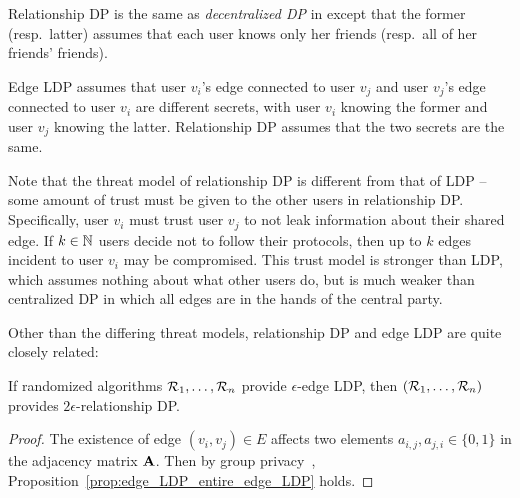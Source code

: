 Relationship DP is the same as \textit{decentralized DP} in \cite{Sun_CCS19} except that the former (resp.~latter) assumes that each user knows only her friends (resp.~all of her friends' friends).

Edge LDP assumes that 
user $v_i$'s edge connected to user $v_j$ 
and 
user $v_j$'s edge connected to user $v_i$ 
are different secrets, with user $v_i$ knowing the former and user $v_j$ knowing the latter. 
Relationship DP assumes that the two secrets are the same.

Note that 
the threat model of relationship DP is 
different from 
that of 
LDP -- 
some amount of trust must be given to the other users 
in relationship DP. 
Specifically, user $v_i$ must trust user $v_j$ to not leak information
about their shared edge. If $k \in \mathbb{N}$ users decide not to follow their protocols, 
then up to $k$ edges incident to user $v_i$ may be compromised. This trust model
is stronger than 
LDP, 
which assumes nothing about what other users 
do,
but is much weaker than centralized DP in which 
all edges are 
in the hands of the central party.

Other than the differing threat models, relationship DP and edge LDP are quite closely related:

\begin{proposition} \label{prop:edge_LDP_entire_edge_LDP} 
If randomized algorithms $\mathcal{R}_1, \ldots, \mathcal{R}_n$ provide $\epsilon$-edge LDP, 
then $(\mathcal{R}_1, \ldots, \mathcal{R}_n)$ provides $2\epsilon$-relationship DP.
\end{proposition}

\begin{proof}
The existence of edge $(v_i, v_j) \in E$ affects two elements $a_{i,j}, a_{j,i} \in \{0,1\}$ in the adjacency matrix $\mathbf{A}$. 
  Then by group privacy~\cite{DP}, Proposition~\ref{prop:edge_LDP_entire_edge_LDP} holds.
\end{proof}


